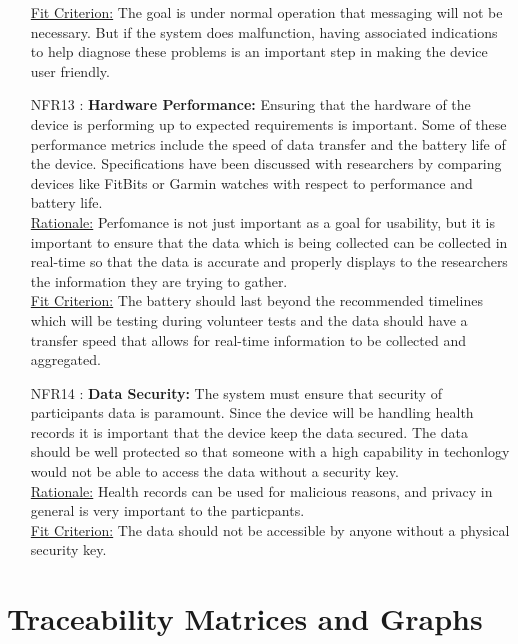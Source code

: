 \documentclass[12pt]{article}
\begin{document}
\begin{itemize}
\underline{Fit Criterion:} The goal is under normal operation that messaging will not be necessary. But if the system does malfunction, having associated indications to help diagnose these problems is an important step in making the device user friendly.\\


\item[NFR13 \label{NFR13}:]
  \textbf{Hardware Performance:} Ensuring that the hardware of the device is performing up to expected requirements is important. Some of these performance metrics include the speed of data transfer and the battery life of the device. Specifications have been discussed with researchers by comparing devices like FitBits or Garmin watches with respect to performance and battery life.\\

\underline{Rationale:} Perfomance is not just important as a goal for usability, but it is important to ensure that the data which is being collected can be collected in real-time so that the data is accurate and properly displays to the researchers the information they are trying to gather.\\

\underline{Fit Criterion:} The battery should last beyond the recommended timelines which will be testing during volunteer tests and the data should have a transfer speed that allows for real-time information to be collected and aggregated.\\


\item[NFR14 \label{NFR14}:]
  \textbf{Data Security:} The system must ensure that security of participants data is paramount. Since the device will be handling health records it is important that the device keep the data secured. The data should be well protected so that someone with a high capability in techonlogy would not be able to access the data without a security key.\\

\underline{Rationale:} Health records can be used for malicious reasons, and privacy in general is very important to the particpants.\\

\underline{Fit Criterion:} The data should not be accessible by anyone without a physical security key.\\


\end{itemize}

\section{Traceability Matrices and Graphs}
\label{TMG}
\end{document}
